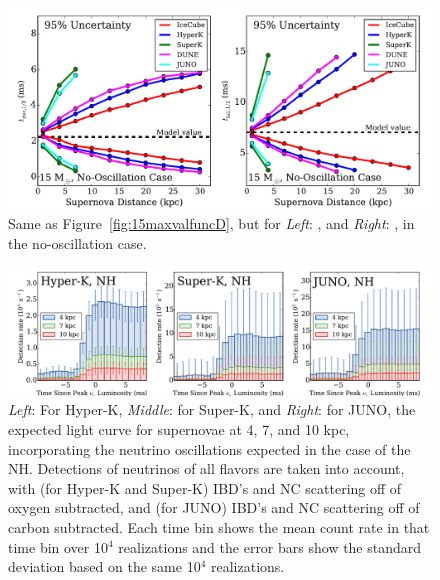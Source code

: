 \begin{figure}[h]
\centerline{\includegraphics[width=\linewidth]{wh07_15_40g_parametergroup_2_95_funcdistance.pdf}}
\caption{\label{fig:15lwhmrwhmfuncD} Same as
  Figure~\ref{fig:15maxvalfuncD}, but for {\it Left}: \trise, and {\it
    Right}: \tfall, in the no-oscillation case.}
\end{figure}


\afterpage{\clearpage}

\begin{figure}[*h]
\centerline{\includegraphics[width=\linewidth]{backgrounds_histogram_groupingnumber_0_NH.pdf}}
\caption{\label{fig:hyperk_superk_juno_nh_backgrounds} {\it Left}: For Hyper-K,
  {\it Middle}: for Super-K, and {\it Right}: for JUNO, the expected light curve
  for supernovae at 4, 7, and 10 kpc, incorporating the neutrino
  oscillations expected in the case of the NH.  Detections of neutrinos of all
  flavors are taken into account, with (for Hyper-K and Super-K) IBD's and NC scattering off of oxygen
  subtracted, and (for JUNO) IBD's and NC scattering off of carbon
  subtracted.  Each time bin shows the mean
  count rate in that time bin over 10$^4$ realizations and the error
  bars show the standard deviation based on the same 10$^4$
  realizations.}
\end{figure}


